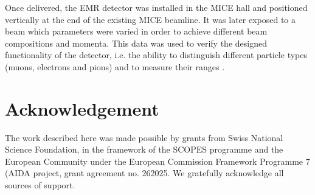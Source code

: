 \documentclass[a4paper,11pt]{article}
\begin{document}
Once delivered, the EMR detector was installed in the MICE hall and positioned vertically at the end of the existing MICE beamline.
It was later exposed to a beam which parameters were varied in order to achieve different beam compositions and momenta. This data was used to verify the designed
functionality of the detector, i.e. the ability to distinguish different particle types (muons, electrons and pions) and to measure their ranges
\cite{performance}. 

\section*{Acknowledgement}
The work described here was made possible by grants from Swiss National Science Foundation, in the framework of the SCOPES programme and the European Community
under the European Commission Framework Programme 7 (AIDA project, grant agreement no. 262025. We gratefully acknowledge all sources of support.




\end{document}
